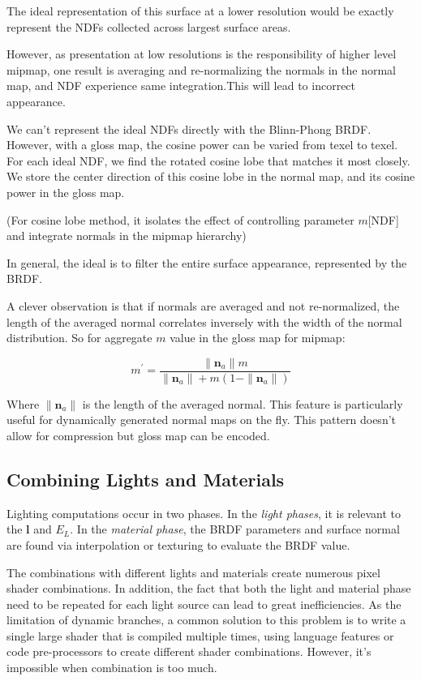\documentclass[10pt, a4paper]{article}
\begin{document}
            The ideal representation of this surface at a lower resolution would be exactly represent the NDFs collected across largest surface areas.
            
            However, as presentation at low resolutions is the responsibility of higher level mipmap, one result is averaging and re-normalizing the normals in the normal map, and NDF experience same integration.This will lead to incorrect appearance.
            
            We can't represent the ideal NDFs directly with the Blinn-Phong BRDF. However, with a gloss map, the cosine power can be varied from texel to texel. For each ideal NDF, we find the rotated cosine lobe that matches it most closely. We store the center direction of this cosine lobe in the normal map, and its cosine power in the gloss map.  

            (For cosine lobe method, it isolates the effect of controlling parameter $m$[NDF] and integrate normals in the mipmap hierarchy)

            In general, the ideal is to filter the entire surface appearance, represented by the BRDF. 

            A clever observation is that  if normals are averaged and not re-normalized, the length of the averaged normal correlates inversely with the width of the normal distribution. So for aggregate $m$ value in the gloss map for mipmap: 

            $$m^{'} = \frac{\|\textbf{n}_a\|m}{\|\textbf{n}_a\| + m(1 - \|\textbf{n}_a\|)}$$

            Where $\|\textbf{n}_a\|$ is the length of the averaged normal. This feature is particularly useful for dynamically generated normal maps on the fly. This pattern doesn't allow for compression but gloss map can be encoded. 
        
    \subsection{Combining Lights and Materials}
        Lighting computations occur in two phases. In the \emph{light phases}, it is relevant to the \textbf{l} and $E_L$. In the \emph{material phase}, the BRDF parameters and surface normal are found via interpolation or texturing to evaluate  the BRDF value.

        The combinations with different lights and materials create numerous pixel shader combinations. In addition, the fact that both the light and material phase need to be repeated for each light source  can lead to great inefficiencies. As the limitation of dynamic branches, a common solution to this problem is to write a single large shader that is compiled multiple times, using language features or code pre-processors to create different shader combinations. However, it's impossible when combination is too much. 
\end{document}
